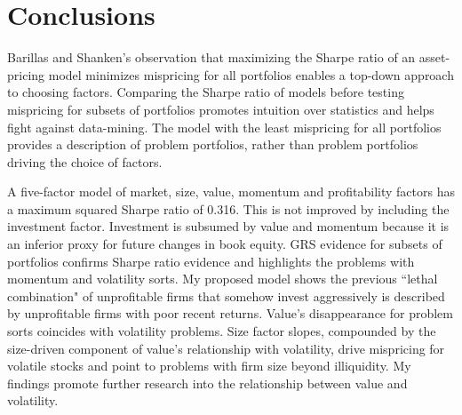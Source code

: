 
\section*{Conclusions}

Barillas and Shanken’s observation that maximizing the Sharpe ratio of an
asset-pricing model minimizes mispricing for all portfolios enables a top-down
approach to choosing factors.
Comparing the Sharpe ratio of models before testing mispricing for subsets of
portfolios promotes intuition over statistics and helps fight against data-mining.
The model with the least mispricing for all portfolios provides a description
of problem portfolios, rather than problem portfolios driving the choice of factors.

A five-factor model of market, size, value, momentum and profitability factors
has a maximum squared Sharpe ratio of 0.316.
This is not improved by including the investment factor.
Investment is subsumed by value and momentum because it is an inferior proxy
for future changes in book equity.
GRS evidence for subsets of portfolios confirms Sharpe ratio evidence and
highlights the problems with momentum and volatility sorts.
My proposed model shows the previous ``lethal combination" of unprofitable
firms that somehow invest aggressively is described by unprofitable firms with
poor recent returns.
Value’s disappearance for problem sorts coincides with volatility problems.
Size factor slopes, compounded by the size-driven component of value's
relationship with volatility, drive mispricing for volatile stocks
and point to problems with firm size beyond illiquidity.
My findings promote further research into the relationship between value and
volatility.
